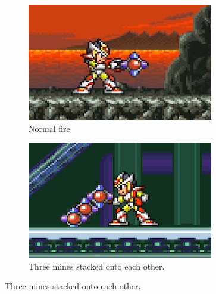 \begin{figure}[htp]
	\centering
	\begin{subfigure}[t]{0.4\linewidth}
		\includegraphics[width=\linewidth]{figures/X2/weapons/M_mine_1.png}	
		\caption{Normal fire}
	\end{subfigure}
	\begin{subfigure}[t]{0.4\linewidth}
		\centering
		\includegraphics[width=\linewidth]{figures/X2/weapons/M_mine_2.png}	
		\caption{Three mines stacked onto each other.}
	\end{subfigure}
		\end{figure}
